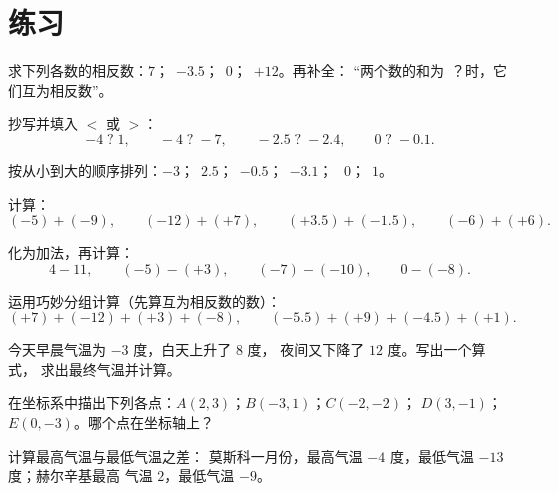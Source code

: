 \section{练习}

\begin{exercise}[$\star$]\label{exo:g7:negatives:1}
求下列各数的相反数：$7$；\ $-3.5$；\ $0$；\ $+12$。再补全：
“两个数的和为~？时，它们互为相反数”。
\end{exercise}

\begin{exercise}[$\star$]\label{exo:g7:negatives:2}
抄写并填入 $<$ 或 $>$：
\[
-4 \;?\; 1, \qquad
-4 \;?\; -7, \qquad
-2.5 \;?\; -2.4, \qquad
0 \;?\; -0.1 .
\]
\end{exercise}

\begin{exercise}[$\star$]\label{exo:g7:negatives:3}
按从小到大的顺序排列：$-3$；\ $2.5$；\ $-0.5$；\ $-3.1$；
\ $0$；\ $1$。
\end{exercise}

\begin{exercise}[$\star$]\label{exo:g7:negatives:4}
计算：
\[
(-5) + (-9), \qquad
(-12) + (+7), \qquad
(+3.5) + (-1.5), \qquad
(-6) + (+6).
\]
\end{exercise}

\begin{exercise}[$\star$]\label{exo:g7:negatives:5}
化为加法，再计算：
\[
4 - 11, \qquad
(-5) - (+3), \qquad
(-7) - (-10), \qquad
0 - (-8).
\]
\end{exercise}

\begin{exercise}[$\star$]\label{exo:g7:negatives:6}
运用巧妙分组计算（先算互为相反数的数）：
\[
(+7) + (-12) + (+3) + (-8), \qquad
(-5.5) + (+9) + (-4.5) + (+1).
\]
\end{exercise}

\begin{exercise}[$\star$]\label{exo:g7:negatives:7}
今天早晨气温为 $-3$ 度，白天上升了 $8$ 度，
夜间又下降了 $12$ 度。写出一个算式，
求出最终气温并计算。
\end{exercise}

\begin{exercise}[$\star$]\label{exo:g7:negatives:8}
在坐标系中描出下列各点：$A(2, 3)$；$B(-3, 1)$；$C(-2, -2)$；
$D(3, -1)$；$E(0, -3)$。哪个点在坐标轴上？
\end{exercise}

\begin{exercise}[$\star\star$]\label{exo:g7:negatives:9}
计算最高气温与最低气温之差：
莫斯科一月份，最高气温 $-4$ 度，最低气温 $-13$ 度；赫尔辛基最高
气温 $2$，最低气温 $-9$。
\end{exercise}

